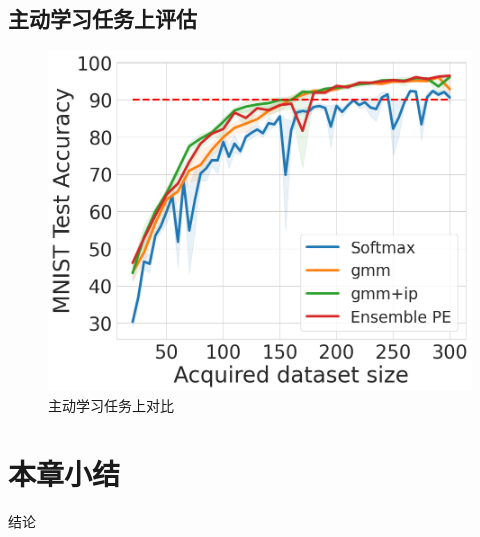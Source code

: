 \subsection{主动学习任务上评估}
\begin{figure}[H]
    \centering
    \includegraphics[width=0.75\linewidth]{assets/3-11.png}
    \caption{主动学习任务上对比}
    \label{fig:enter-label}
\end{figure}

\section{本章小结}
结论
